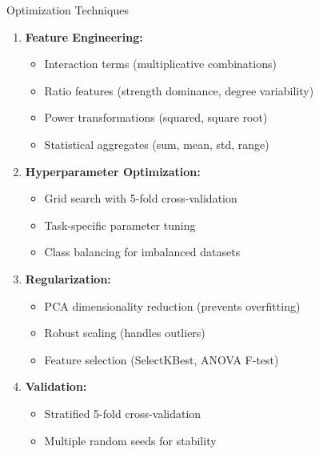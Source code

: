 \documentclass{beamer}
\begin{document}
\begin{frame}{Optimization Techniques}
    \begin{enumerate}
        \item \textbf{Feature Engineering:}
        \begin{itemize}
            \item Interaction terms (multiplicative combinations)
            \item Ratio features (strength dominance, degree variability)
            \item Power transformations (squared, square root)
            \item Statistical aggregates (sum, mean, std, range)
        \end{itemize}
        
        \item \textbf{Hyperparameter Optimization:}
        \begin{itemize}
            \item Grid search with 5-fold cross-validation
            \item Task-specific parameter tuning
            \item Class balancing for imbalanced datasets
        \end{itemize}
        
        \item \textbf{Regularization:}
        \begin{itemize}
            \item PCA dimensionality reduction (prevents overfitting)
            \item Robust scaling (handles outliers)
            \item Feature selection (SelectKBest, ANOVA F-test)
        \end{itemize}
        
        \item \textbf{Validation:}
        \begin{itemize}
            \item Stratified 5-fold cross-validation
            \item Multiple random seeds for stability
        \end{itemize}
    \end{enumerate}
\end{frame}


\end{document}
